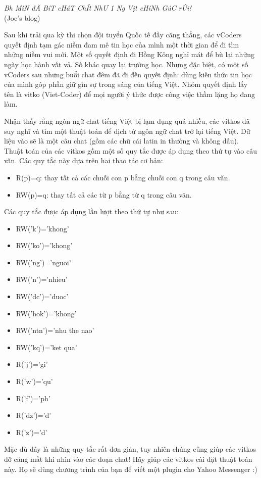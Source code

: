 \textit{    Bh MìN đÃ BíT cHáT ChÍt NhƯ 1 Ng Vịt cHíNh GúC rÙi!   }
\\   (Joe's blog)    

   Sau khi trải qua kỳ thi chọn đội tuyển Quốc tế đầy căng thẳng, các vCoders quyết định tạm gác niềm đam mê tin học của mình một thời gian để đi tìm những niềm vui mới. Một số quyết định đi Hồng Kông nghỉ mát để bù lại những ngày học hành vất vả. Số khác quay lại trường học. Nhưng đặc biệt, có một số vCoders sau những buổi chat đêm đã đi đến quyết định: dùng kiến thức tin học của mình góp phần giữ gìn sự trong sáng của tiếng Việt. Nhóm quyết định lấy tên là vitko (Viet-Coder) để mọi người ý thức được công việc thầm lặng họ đang làm.  

   Nhận thấy rằng ngôn ngữ chat tiếng Việt bị lạm dụng quá nhiều, các vitkos đã suy nghĩ và tìm một thuật toán để dịch từ ngôn ngữ chat trở lại tiếng Việt. Dữ liệu vào sẽ là một câu chat (gồm các chữ cái latin in thường và không dấu). Thuật toán của các vitkos gồm một số quy tắc được áp dụng theo thứ tự vào câu văn. Các quy tắc này dựa trên hai thao tác cơ bản:  
\begin{itemize}
	\item     R(p)=q: thay tất cả các chuỗi con p bằng chuỗi con q trong câu văn.   
	\item     RW(p)=q: thay tất cả các từ p bằng từ q trong câu văn.   
\end{itemize}

   Các quy tắc được áp dụng lần lượt theo thứ tự như sau:  
\begin{itemize}
	\item     RW('k')='khong'   
	\item     RW('ko')='khong'   
	\item     RW('ng')='nguoi'   
	\item     RW('n')='nhieu'   
	\item     RW('dc')='duoc'   
	\item     RW('hok')='khong'   
	\item     RW('ntn')='nhu the nao'   
	\item     RW('kq')='ket qua'   
	\item     R('j')='gi'   
	\item     R('w')='qu'   
	\item     R('f')='ph'   
	\item     R('dz')='d'   
	\item     R('z')='d'   
\end{itemize}

   Mặc dù đây là những quy tắc rất đơn giản, tuy nhiên chúng cũng giúp các vitkos đỡ căng mắt khi nhìn vào các đoạn chat! Hãy giúp các vitkos cài đặt thuật toán này. Họ sẽ dùng chương trình của bạn để viết một plugin cho Yahoo Messenger :)  

\